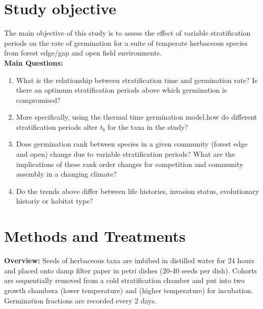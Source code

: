 \documentclass{article}\usepackage[]{graphicx}\usepackage[]{color}
\begin{document}
\section*{Study objective}
The main objective of this study is to assess the effect of variable stratification periods on the rate of germination for a suite of temperate herbaceous species from forest edge/gap and open field environments.\\

\textbf{Main Questions:}
\begin{enumerate}
\item What is the relationship between stratification time and germination rate? Is there an optimum stratification periods above which germination is compromised?
\item More specifically, using the thermal time germination model,how do different stratification periods alter $t_b$ for the taxa in the study?
\item Does germination rank between species in a given community (forest edge and open) change due to variable stratification periods? What are the implications of these rank order changes for competition and community assembly in a changing climate?
\item Do the trends above differ between life histories, invasion status, evolutionary historiy or habitat type?
\end{enumerate}
\section*{Methods and Treatments}
\textbf{Overview:} Seeds of herbaceous  taxa are imbibed in distilled water for 24 hours and placed onto damp filter paper in petri dishes (20-40 seeds per dish).  Cohorts are sequentially removed from a cold stratification chamber and put into two growth chambera (lower temperature) and (higher temperature) for incubation. Germination fractions are recorded every 2 days.
\end{document}
